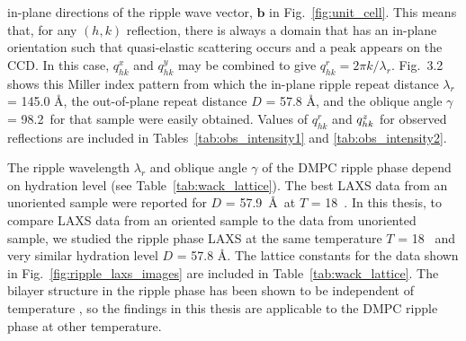in-plane directions of the
ripple wave vector, $\mathbf{b}$ in Fig.~\ref{fig:unit_cell}. 
This means that, for any $(h,k)$ reflection, there is always a domain that has 
an in-plane orientation such that quasi-elastic scattering occurs and a peak 
appears on the CCD.  
In this case, $q_{hk}^x$ and $q_{hk}^y$ may be combined to 
give $q_{hk}^r = 2\pi k/\lambda_r$.  
Fig.~3.2 shows this Miller index pattern from which the in-plane ripple repeat 
distance $\lambda_r$ = 145.0 \AA, the out-of-plane repeat distance 
$D$ = 57.8 \AA, and the oblique angle $\gamma$ = 98.2\textdegree\ for that 
sample were easily obtained.
Values of $q_{hk}^r$ and $q_{hk}^z$ for observed reflections are included
in Tables~\ref{tab:obs_intensity1} and \ref{tab:obs_intensity2}.

The ripple wavelength $\lambda_r$ and oblique angle $\gamma$ of the DMPC
ripple phase depend on hydration level \cite{ref:Wack89} 
(see Table~\ref{tab:wack_lattice}).
The best LAXS data from an unoriented sample were reported for $D$ = 57.9~\AA\ 
at $T$ = 18~\textcelsius. In this thesis, 
to compare LAXS data from an oriented sample to the data from unoriented sample,
we studied the ripple phase LAXS at the same temperature $T$ = 18 \textcelsius\ 
and very similar hydration level $D$ = 57.8 \AA.
The lattice constants for the data shown in Fig.~\ref{fig:ripple_laxs_images} are 
included in Table~\ref{tab:wack_lattice}.
The bilayer structure in the ripple phase has been shown to be independent 
of temperature \cite{ref:Sengupta03}, so the findings in this thesis are
applicable to the DMPC ripple phase at other temperature.


